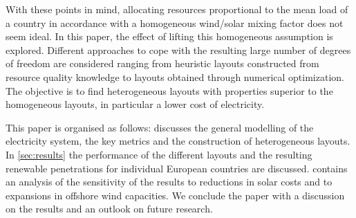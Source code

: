 \documentclass[a4paper, 5p, sort&compress]{elsarticle}%
\begin{document}
With these points in mind, allocating resources proportional to the
mean load of a country in accordance with a homogeneous wind/solar
mixing factor does not seem ideal. In this paper, the effect of
lifting this homogeneous assumption is explored. Different approaches
to cope with the resulting large number of degrees of freedom are
considered ranging from heuristic layouts constructed from resource
quality knowledge to layouts obtained through numerical
optimization. The objective is to find heterogeneous layouts with
properties superior to the homogeneous layouts, in particular a lower
cost of electricity.




This paper is organised as follows:  discusses the
general modelling of the electricity system, the key metrics and the
construction of heterogeneous layouts. In \cref{sec:results} the
performance of the different layouts and the resulting renewable
penetrations for individual European countries are
discussed.  contains an analysis of the
sensitivity of the results to reductions in solar costs and to
expansions in offshore wind capacities. We conclude the paper with a
discussion on the results and an outlook on future research.
\end{document}

